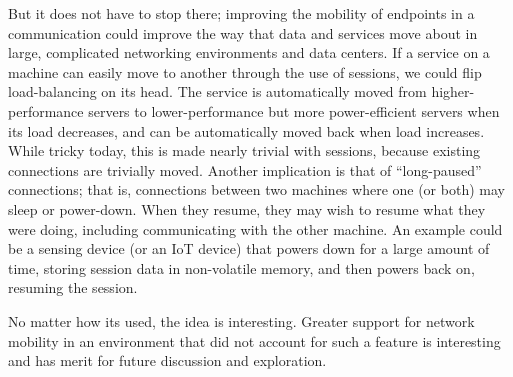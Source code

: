 \documentclass[twocolumn,11pt]{article}
\begin{document}
But it does not have to stop there; improving the mobility of
endpoints in a communication could improve the way that data and services move
about in large, complicated networking environments and data centers. If a
service on a machine can easily move to another through the use of sessions, we
could flip load-balancing on its head. The service is automatically moved from
higher-performance servers to lower-performance but more power-efficient servers
when its load decreases, and can be automatically moved back when load
increases. While tricky today, this is made nearly trivial with sessions, because existing connections
are trivially moved. Another implication is that of ``long-paused'' connections;
that is, connections between two machines where one (or both) may sleep or
power-down. When they resume, they may wish to resume what they were doing,
including communicating with the other machine. An example could be a sensing
device (or an IoT device) that powers down for a large amount of time, storing
session data in non-volatile memory, and then powers back on, resuming the
session.

No matter how its used, the idea is interesting. Greater support for network
mobility in an environment that did not account for such a feature is
interesting and has merit for future discussion and exploration.












\end{document}
